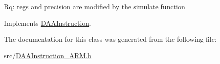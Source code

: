 Rq\+: regs and precision are modified by the simulate function 

Implements \hyperlink{classDAAInstruction_a61d0b9bece1e0ead89a46c0197276324}{D\+A\+A\+Instruction}.



The documentation for this class was generated from the following file\+:\begin{DoxyCompactItemize}
\item 
src/\hyperlink{DAAInstruction__ARM_8h}{D\+A\+A\+Instruction\+\_\+\+A\+R\+M.\+h}\end{DoxyCompactItemize}
